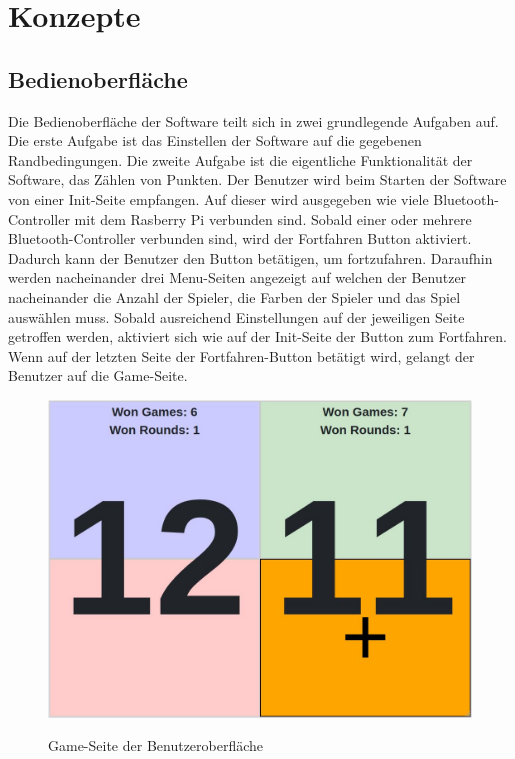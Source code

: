 \chapter{Konzepte}

\section{Bedienoberfläche}
Die Bedienoberfläche der Software teilt sich in zwei grundlegende Aufgaben auf. Die erste Aufgabe ist das Einstellen der Software auf die gegebenen Randbedingungen. Die zweite Aufgabe ist die eigentliche Funktionalität der Software, das Zählen von Punkten. Der Benutzer wird beim Starten der Software von einer Init-Seite empfangen. Auf dieser wird ausgegeben wie viele Bluetooth-Controller mit dem Rasberry Pi verbunden sind. Sobald einer oder mehrere Bluetooth-Controller verbunden sind, wird der \glqq Fortfahren\grqq{} Button aktiviert. Dadurch kann der Benutzer den Button betätigen, um fortzufahren. Daraufhin werden nacheinander drei Menu-Seiten angezeigt auf welchen der Benutzer nacheinander die Anzahl der Spieler, die Farben der Spieler und das Spiel auswählen muss. Sobald ausreichend Einstellungen auf der jeweiligen Seite getroffen werden, aktiviert sich wie auf der Init-Seite der Button zum Fortfahren. Wenn auf der letzten Seite der Fortfahren-Button betätigt wird, gelangt der Benutzer auf die Game-Seite. 

\begin{figure}[h]
\centering
\includegraphics[scale=0.5]{Grafiken/game_seite}
\label{Game Seite}
\caption{Game-Seite der Benutzeroberfläche}
\end{figure}

